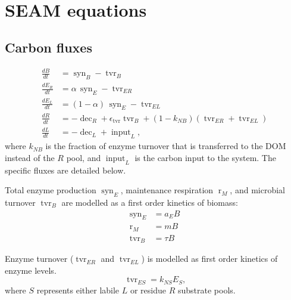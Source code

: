 \section{\\ \\ \hspace*{-7mm}  SEAM equations \label{app:SEAM}}    %

\subsection{Carbon fluxes}
\begin{subequations}
\label{eq:SEAM}
\begin{align}
\frac{dB}{dt} &= \operatorname{syn}_B - \operatorname{tvr}_B \\
\frac{dE_R}{dt} &= \alpha \, \operatorname{syn}_E - \operatorname{tvr}_{ER} \\
\frac{dE_L}{dt} &= (1 - \alpha)  \, \operatorname{syn}_E -\operatorname{tvr}_{EL}\\
\frac{dR}{dt} &=  - \operatorname{dec}_R +
\epsilon_{\operatorname{tvr}}  \operatorname{tvr}_B + (1 -k_{NB})
(\operatorname{tvr}_{ER} + \operatorname{tvr}_{EL})\\
\frac{dL}{dt} &=  - \operatorname{dec}_L + \operatorname{input}_L
\text{,} 
\end{align}
\end{subequations}
where $k_{NB}$ is the fraction of enzyme turnover that is transferred to the
DOM instead of the $R$ pool, and $\operatorname{input}_L$ is the carbon input
to the system. The specific fluxes are detailed below.

Total enzyme production $\operatorname{syn}_E$, maintenance respiration
$\operatorname{r}_{M}$, and microbial turnover $\operatorname{tvr}_B$ are
modelled as a first order kinetics of biomass:
\begin{subequations}
\begin{align}
\label{eq:synE} \operatorname{syn}_E &= a_E B \\
\label{eq:rM} \operatorname{r}_{M} &= m B \\
\label{eq:tvrB} \operatorname{tvr}_B &= \tau B 
\end{align}
\end{subequations}

Enzyme turnover ($\operatorname{tvr}_{ER}$ and $\operatorname{tvr}_{EL}$) is
modelled as first order kinetics of enzyme levels.
\begin{equation}
\label{eq:tvrE}
\operatorname{tvr}_{ES} = k_{NS} E_S \text{,}
\end{equation}
where $S$ represents either labile $L$ or residue $R$ substrate pools.  

